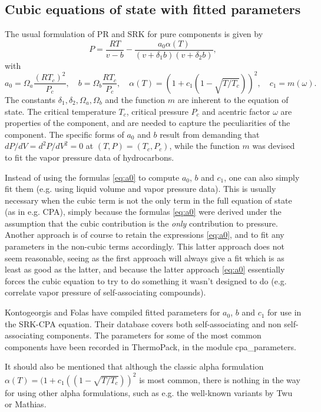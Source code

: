 \documentclass[10pt, a4paper]{article}
\newcommand{\lp}{\left(}
\newcommand{\rp}{\right)}
\begin{document}
\subsection{Cubic equations of state with fitted parameters} \label{subsec:fitted parameters}
The usual formulation of PR and SRK for pure components is given by
$$
P = \frac{RT}{v-b}-\frac{a_0 \alpha(T)}{(v+\delta_1 b)(v+\delta_2 b)},
$$
with
\begin{equation}
\label{eq:a0}
  a_0 = \Omega_a \frac{(RT_c)^2}{P_c}, \quad b = \Omega_b \frac{RT_c}{P_c}, \quad \alpha(T) = \lp 1+c_1(1-\sqrt{T/T_c}) \rp^2, \quad c_1 = m(\omega).
\end{equation}
The constants $\delta_1, \delta_2, \Omega_a, \Omega_b$ and the function $m$ are inherent to the equation of state. The critical temperature $T_c$, critical pressure $P_c$ and acentric factor $\omega$ are properties of the component, and are needed to capture the peculiarities of the component. The specific forms of $a_0$ and $b$ result from demanding that $dP/dV = d^2P/dV^2 = 0$ at $(T,P) = (T_c,P_c)$, while the function $m$ was devised to fit the vapor pressure data of hydrocarbons.

Instead of using the formulas \eqref{eq:a0} to compute $a_0$, $b$ and $c_1$, one can also simply fit them (e.g. using liquid volume and vapor pressure data). This is usually necessary when the cubic term is not the only term in the full equation of state (as in e.g. CPA), simply because the formulas \eqref{eq:a0} were derived under the assumption that the cubic contribution is the \textit{only} contribution to pressure. Another approach is of course to retain the expressions \eqref{eq:a0}, and to fit any parameters in the non-cubic terms accordingly. This latter approach does not seem reasonable, seeing as the first approach will always give a fit which is as least as good as the latter, and because the latter approach \eqref{eq:a0} essentially forces the cubic equation to try to do something it wasn't designed to do (e.g. correlate vapor pressure of self-associating compounds).

Kontogeorgis and Folas \cite{Kontogeorgis10} have compiled fitted parameters for $a_0$, $b$ and $c_1$ for use in the SRK-CPA equation. Their database covers both self-associating and non self-associating components. The parameters for some of the most common components have been recorded in ThermoPack, in the module cpa\_parameters.

It should also be mentioned that although the classic alpha formulation $\alpha(T) = (1+c_1((1-\sqrt{T/T_c}))^2$ is most common, there is nothing in the way for using other alpha formulations, such as e.g. the well-known variants by Twu or Mathias.
\end{document}
